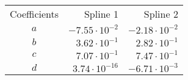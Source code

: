 \begin{tabular}{crr}
    \toprule
    Coefficients & Spline 1 & Spline 2 \\ \otoprule
    $a$ & $-7.55 \cdot 10^{-2}$ & $-2.18 \cdot 10^{-2}$ \\
    $b$ & $3.62 \cdot 10^{-1}$ & $2.82 \cdot 10^{-1}$ \\
    $c$ & $7.07 \cdot 10^{-1}$ & $7.47 \cdot 10^{-1}$ \\
    $d$ & $3.74 \cdot 10^{-16}$ & $-6.71 \cdot 10^{-3}$ \\
    \bottomrule
\end{tabular}
